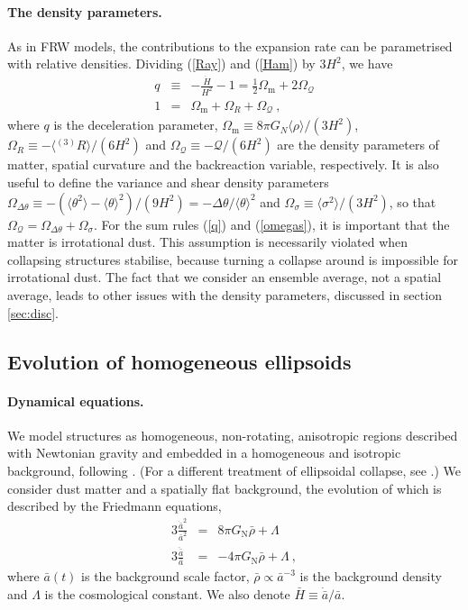 \documentclass[11pt, a4paper]{article}
\newcommand{\bea}{\begin{eqnarray}} \newcommand{\eea}{\end{eqnarray}}
\newcommand{\el}{\nonumber \\}
\newcommand{\re}[1]{(\ref{#1})}
\renewcommand{\sec}[1]{section \ref{#1}}
\newcommand{\para}{\paragraph}
\newcommand{\GN}{G_{\mathrm{N}}}
\newcommand{\Hdot}{\dot{H}}
\newcommand{\rhob}{\bar{\rho}}
\newcommand{\av}[1]{\langle{#1}\rangle}
\newcommand{\sQ}{\mathcal{Q}}
\newcommand{\sR}{{^{(3)}R}}
\newcommand{\Om}{\Omega_{\mathrm{m}}}
\newcommand{\OQ}{\Omega_{\sQ}}
\newcommand{\OR}{\Omega_{R}}
\newcommand{\Ov}{\Omega_{\Delta\theta}}
\begin{document}
\paragraph{The density parameters.}

As in FRW models, the contributions to the expansion rate can be parametrised with relative densities. Dividing \re{Ray} and \re{Ham} by $3 H^2$, we have \cite{Buchert:1999er}
\bea
  \label{q} q &\equiv& - \frac{\Hdot}{H^2} - 1  = \frac{1}{2} \Om + 2 \OQ \\
  \label{omegas} 1 &=& \Om + \OR + \OQ \ ,
\eea
%
where $q$ is the deceleration parameter, $\Om\equiv 8\pi G_N \av{\rho}/(3 H^2)$, $\OR\equiv-\av{\sR}/(6 H^2)$ and $\OQ\equiv-\sQ/(6 H^2)$ are the density parameters of matter, spatial curvature and the backreaction variable, respectively. It is also useful to define the variance and shear density parameters $\Ov\equiv-(\av{\theta^2}-\av{\theta}^2)/(9H^2)=-\Delta\theta/\av{\theta}^2$ and $\Omega_\sigma\equiv\av{\sigma^2}/(3 H^2)$, so that $\OQ=\Ov+\Omega_\sigma$.
For the sum rules \re{q} and \re{omegas}, it is important that the matter is irrotational dust. This assumption is necessarily violated when collapsing structures stabilise, because turning a collapse around is impossible for irrotational dust. The fact that we consider an ensemble average, not a spatial average, leads to other issues with the density parameters, discussed in \sec{sec:disc}.

\subsection{Evolution of homogeneous ellipsoids} \label{sec:ell}

\para{Dynamical equations.}

We model structures as homogeneous, non-rotating, anisotropic regions described with Newtonian gravity and embedded in a homogeneous and isotropic background, following \cite{Peebles:1980, Bond:1996, Angrick:2010qg}. (For a different treatment of ellipsoidal collapse, see \cite{Audit:1996zj}.) We consider dust matter and a spatially flat background, the evolution of which is described by the Friedmann equations,
\bea
  \label{Fried1} 3 \frac{\dot{\bar{a}}^2}{\bar{a}^2} &=& 8\pi\GN\rhob + \Lambda \el
  \label{Fried2} 3 \frac{\ddot{\bar{a}}}{\bar a} &=& - 4\pi\GN\rhob + \Lambda \ ,
\eea
%
where $\bar a(t)$ is the background scale factor, $\rhob\propto\bar a^{-3}$ is the background density and $\Lambda$ is the cosmological constant. We also denote $\bar H\equiv\dot{\bar a}/\bar a$.
\end{document}
